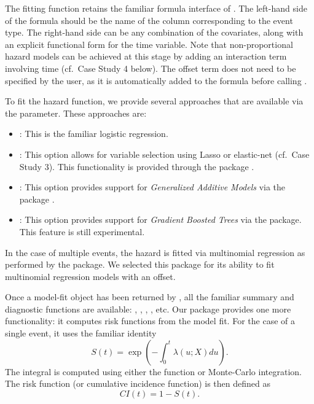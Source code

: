 \documentclass[
]{jss}
\providecommand{\tightlist}{%
  \setlength{\itemsep}{0pt}\setlength{\parskip}{0pt}}
\begin{document}
The fitting function retains the familiar formula interface of
. The left-hand side of the formula should be the name of the
column corresponding to the event type. The right-hand side can be any
combination of the covariates, along with an explicit functional form
for the time variable. Note that non-proportional hazard models can be
achieved at this stage by adding an interaction term involving time
(cf.~Case Study 4 below). The offset term does not need to be specified
by the user, as it is automatically added to the formula before calling
.

To fit the hazard function, we provide several approaches that are
available via the  parameter. These approaches are:

\begin{itemize}
\tightlist
\item
  : This is the familiar logistic regression.
\item
  : This option allows for variable selection using Lasso
  or elastic-net (cf.~Case Study 3). This functionality is provided
  through the  package \citep{friedman2010jss}.
\item
  : This option provides support for \emph{Generalized
  Additive Models} via the  package
  \citep{hastie1987generalized}.
\item
  : This option provides support for \emph{Gradient Boosted
  Trees} via the  package. This feature is still experimental.
\end{itemize}

In the case of multiple events, the hazard is fitted via multinomial
regression as performed by the  package. We selected this
package for its ability to fit multinomial regression models with an
offset.

Once a model-fit object has been returned by , all
the familiar summary and diagnostic functions are available:
, , , , etc. Our
package provides one more functionality: it computes risk functions from
the model fit. For the case of a single event, it uses the familiar
identity \begin{equation}\label{eqn:surv}
S(t) = \exp\left(-\int_0^t \lambda(u;X) du\right).
\end{equation} The integral is computed using either the
 function or Monte-Carlo integration. The risk
function (or cumulative incidence function) is then defined as
\begin{equation}\label{eqn:CI}
CI(t) = 1 - S(t).
\end{equation}
\end{document}
